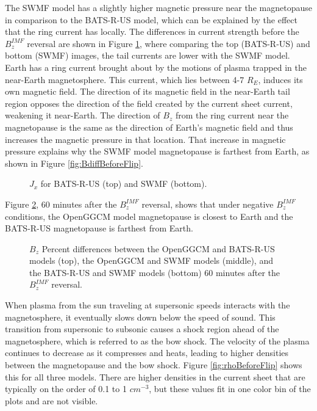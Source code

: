 The SWMF model has a slightly higher magnetic pressure near the magnetopause in
comparison to the BATS-R-US model, which can be explained by the effect that the ring
current has locally. The differences in current strength before the $B_z^{IMF}$
reversal are shown in Figure \ref{fig:JxRingCurrent}, where comparing the top
(BATS-R-US) and bottom (SWMF) images, the tail currents are lower with the SWMF
model. Earth has a ring current brought about by the motions of plasma
trapped in the near-Earth magnetosphere. This current, which lies between
4-7 $R_E$, induces its own magnetic field. The direction of its magnetic field 
in the near-Earth tail region opposes the direction of the field created by the current
sheet current, weakening it near-Earth. The direction of $B_z$ from the ring
current near the magnetopause is the same as the direction of Earth's magnetic
field and thus increases the magnetic pressure in that location. That increase
in magnetic pressure explains why the SWMF model magnetopause is farthest from
Earth, as shown in Figure \ref{fig:BdiffBeforeFlip}.

\begin{figure}
	\centering
	\caption{$J_x$ for BATS-R-US (top) and SWMF (bottom).}
	\figSpace
	\label{fig:JxRingCurrent}
\end{figure}

Figure \ref{fig:BdiffAfterFlip}, 60 minutes after the $B_z^{IMF}$ reversal, shows that
under negative $B_z^{IMF}$ conditions, the OpenGGCM model magnetopause is closest to
Earth and the BATS-R-US magnetopause is farthest from Earth.

\begin{figure}
	\centering
	\caption{$B_z$ Percent differences between the OpenGGCM and
	BATS-R-US models (top), the OpenGGCM and SWMF models (middle), and the
	BATS-R-US and SWMF models (bottom) 60 minutes after the $B_z^{IMF}$ reversal.}
	\figSpace
	\label{fig:BdiffAfterFlip}
\end{figure}

When plasma from the sun traveling at supersonic speeds interacts with the
magnetosphere, it eventually slows down below the speed of sound. This
transition from supersonic to subsonic causes a shock region ahead of the
magnetosphere, which is referred to as the bow shock. The velocity of the plasma
continues to decrease as it compresses and heats, leading to higher densities
between the magnetopause and the bow shock. Figure \ref{fig:rhoBeforeFlip} shows
this for all three models. There are higher densities in the current sheet that
are typically on the order of 0.1 to 1 $cm^{-3}$, but these values fit
in one color bin of the plots and are not visible.

